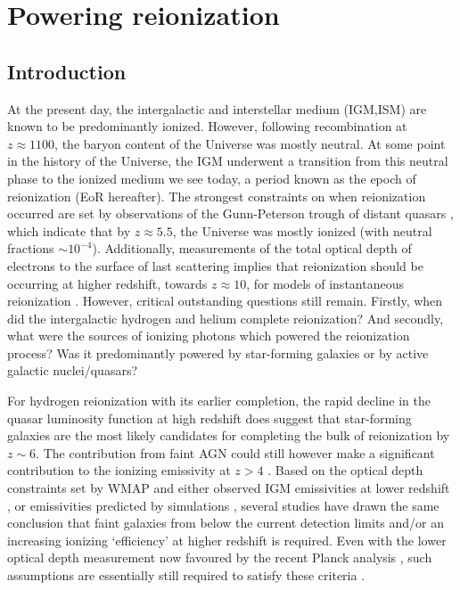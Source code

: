 \chapter{Powering reionization}

\section{Introduction}
At the present day, the intergalactic and interstellar medium (IGM,ISM) are known to be predominantly ionized. However, following recombination at $z\approx1100$, the baryon content of the Universe was mostly neutral. At some point in the history of the Universe, the IGM underwent a transition from this neutral phase to the ionized medium we see today, a period known as the epoch of reionization (EoR hereafter). The strongest constraints on when reionization occurred are set by observations of the Gunn-Peterson trough of distant quasars \citep{2006ARA&A..44..415F}, which indicate that by $z\approx 5.5$, the Universe was mostly ionized (with neutral fractions $\sim 10^{-4}$). Additionally, measurements of the total optical depth of electrons to the surface of last scattering implies that reionization should be occurring at higher redshift, towards $z \approx 10$, for models of instantaneous reionization \citep{Hinshaw:2013dd,Bennett:2013ew}. However, critical outstanding questions still remain. Firstly, when did the intergalactic hydrogen and helium complete reionization? And secondly, what were the sources of ionizing photons which powered the reionization process? Was it predominantly powered by star-forming galaxies or by active galactic nuclei/quasars?

For hydrogen reionization with its earlier completion, the rapid decline in the quasar luminosity function at high redshift \citep{Willott:2010bk,Fontanot:2012fx,Fontanot:2014jz} does suggest that star-forming galaxies are the most likely candidates for completing the bulk of reionization by $z\sim6$. The contribution from faint AGN could still however make a significant contribution to the ionizing emissivity at $z>4$ \citep{Giallongo:2015to}. Based on the optical depth constraints set by WMAP \citep{Hinshaw:2013dd} and either observed IGM emissivities at lower redshift \citep{Kuhlen:2012ka,Robertson:2013ji,Becker:2013hc}, or emissivities predicted by simulations \citep{Ciardi:2012hl}, several studies have drawn the same conclusion that faint galaxies from below the current detection limits and/or an increasing ionizing `efficiency' at higher redshift is required. Even with the lower optical depth measurement now favoured by the recent Planck analysis \citep{Collaboration:2015tp}, such assumptions are essentially still required to satisfy these criteria \citep{Robertson:2015wk}.

